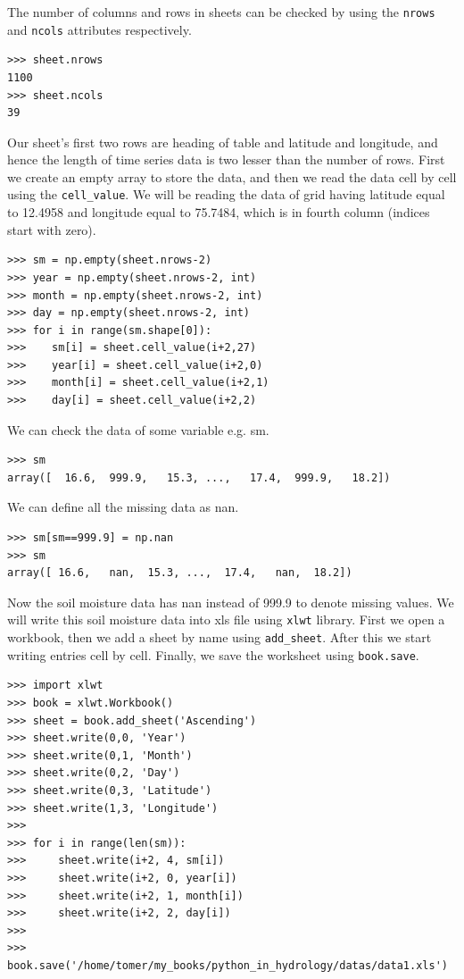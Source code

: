 \documentclass[10pt]{book}
\begin{document}
{The number of columns and rows in sheets can be checked by using the \verb"nrows" and \verb"ncols" attributes respectively. 
\beforeverb \begin{verbatim}
>>> sheet.nrows
1100
>>> sheet.ncols
39
\end{verbatim} \afterverb
Our sheet's first two rows are heading of table and latitude and longitude, and hence the length of time series data is two lesser than the number of rows. First we create an empty array to store the data, and then we read the data cell by cell using the \verb"cell_value". We will be reading the data of grid having latitude equal to 12.4958 and longitude equal to 75.7484, which is in fourth column (indices start with zero). 
\beforeverb \begin{verbatim}
>>> sm = np.empty(sheet.nrows-2)
>>> year = np.empty(sheet.nrows-2, int)
>>> month = np.empty(sheet.nrows-2, int)
>>> day = np.empty(sheet.nrows-2, int)
>>> for i in range(sm.shape[0]): 
>>>    sm[i] = sheet.cell_value(i+2,27)  
>>>    year[i] = sheet.cell_value(i+2,0)
>>>    month[i] = sheet.cell_value(i+2,1)
>>>    day[i] = sheet.cell_value(i+2,2)
\end{verbatim} \afterverb
We can check the data of some variable e.g. sm.
\beforeverb \begin{verbatim}
>>> sm
array([  16.6,  999.9,   15.3, ...,   17.4,  999.9,   18.2])
\end{verbatim} \afterverb
We can define all the missing data as nan. 
\beforeverb \begin{verbatim}
>>> sm[sm==999.9] = np.nan
>>> sm
array([ 16.6,   nan,  15.3, ...,  17.4,   nan,  18.2])
\end{verbatim} \afterverb
Now the soil moisture data has nan instead of 999.9 to denote missing values. We will write this soil moisture data into xls file using \verb"xlwt" library. First we open a workbook, then we add a sheet by name using \verb"add_sheet". After this we start writing entries cell by cell. Finally, we save the worksheet using \verb"book.save". 

\beforeverb \begin{verbatim}
>>> import xlwt
>>> book = xlwt.Workbook()
>>> sheet = book.add_sheet('Ascending')
>>> sheet.write(0,0, 'Year')
>>> sheet.write(0,1, 'Month')
>>> sheet.write(0,2, 'Day')
>>> sheet.write(0,3, 'Latitude')
>>> sheet.write(1,3, 'Longitude')
>>> 
>>> for i in range(len(sm)):
>>>     sheet.write(i+2, 4, sm[i])
>>>     sheet.write(i+2, 0, year[i])
>>>     sheet.write(i+2, 1, month[i])
>>>     sheet.write(i+2, 2, day[i])
>>>     
>>> book.save('/home/tomer/my_books/python_in_hydrology/datas/data1.xls')
\end{verbatim} \afterverb

}
\end{document}

